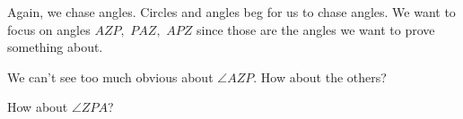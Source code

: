 


Again, we chase angles. Circles and angles beg for us to chase angles. We want to focus on angles $AZP,$ $PAZ,$ $APZ$ since those are the angles we want to prove something about.

We can't see too much obvious about $\angle AZP.$  How about the others?

How about $\angle ZPA$?















